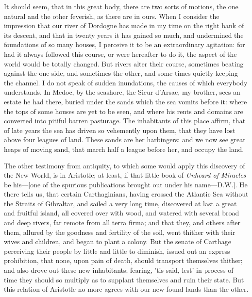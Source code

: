 \documentclass[twocolumn]{article}
\newcommand{\specialbreak}{\newpage\noindent}
\begin{document}
	It should seem, that in this great body, there are two sorts of motions, the one natural and the other feverish, as there are in ours. When I consider the impression that our river of Dordogne has made in my time on the right bank of its descent, and that in twenty years it has gained so much, and undermined the foundations of so many houses, I perceive it to be an extraordinary agitation: for had it always followed this course, or were hereafter to do it, the aspect of the world would be totally changed. But rivers alter their course, sometimes beating against the one side, and sometimes the other, and some times quietly keeping the channel. I do not speak of sudden inundations, the causes of which everybody understands. In Medoc, by the seashore, the Sieur d’Arsac, my brother, sees an estate he had there, buried under the sands which the sea vomits before it: where the tops of some houses are yet to be seen, and where his rents and domains are converted into pitiful barren pasturage. The inhabitants of this place affirm, that of late years the sea has driven so vehemently upon them, that they have lost above four leagues of land. These sands are her harbingers: and we now see great heaps of moving sand, that march half a league before her, and occupy the land.

	The other testimony from antiquity, to which some would apply this discovery of the New World, is in Aristotle; at least, if that little book of \emph{Unheard of Miracles} be his---[one of the spurious publications brought out under his name---D.W.]. He there tells us, that certain Carthaginians, having crossed the Atlantic Sea without the Straits of Gibraltar, and sailed a very long time, discovered at last a great and fruitful island, all covered over with wood, and watered with several broad and deep rivers, far remote from all terra firma; and that they, and others after them, allured by the goodness and fertility of the soil, went thither with their wives and children, and began to plant a colony. But the senate of Carthage perceiving their people by little and little to diminish, issued out an express prohibition, that none, upon pain of death, should transport themselves thither; and also drove out these new inhabitants; fearing, ’tis said, lest’ in process of time they should so multiply as to supplant \specialbreak themselves and ruin their state. But this relation of Aristotle no more agrees with our new-found lands than the other.
\end{document}
